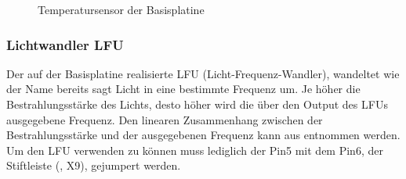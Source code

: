 \begin{figure}[htb]
    \centering
    \qquad
    \qquad
    \caption[Temperatursensor der Basisplatine]{Temperatursensor der \gls{Basisplatine}}
    \label{fig:basisplatine-temp}
\end{figure}

\subsubsection{Lichtwandler LFU}
Der auf der \gls{Basisplatine} realisierte LFU (Licht-Frequenz-Wandler), wandeltet wie der Name bereits sagt Licht in eine bestimmte Frequenz um. Je höher die Bestrahlungsstärke des Lichts, desto höher wird die über den Output des LFUs ausgegebene Frequenz. Den linearen Zusammenhang zwischen der Bestrahlungsstärke und der ausgegebenen Frequenz kann aus  entnommen werden. Um den LFU verwenden zu können muss lediglich der Pin5 mit dem Pin6, der Stiftleiste (, X9), gejumpert werden.

